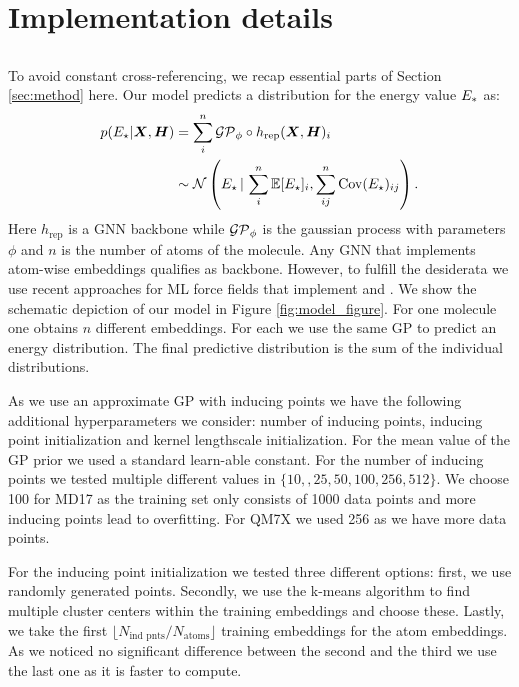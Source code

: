 \section{Implementation details}\label{app:implementation_details}
\subsection{\ours{}}
To avoid constant cross-referencing, we recap essential parts of Section \ref{sec:method} here. Our model predicts a distribution for the energy value $E_*$ as: 
\begin{align}
    p(E_\star \vert \bm{X}, \bm{H}) &= \sum_i^n \mathcal{GP}_\phi \circ h_{\text{rep}}(\bm{X}, \bm{H})_{i}\\ 
    &\sim \mathcal{N}\left(E_\star \,\vert\,\sum_i^n \operatorname{\mathbb{E}} [E_\star]_i, \sum_{ij}^n \mathrm{Cov}(E_\star)_{ij}\right).\nonumber
\end{align}
Here $h_{\text{rep}}$ is a GNN backbone while $\mathcal{GP}_\phi$ is the gaussian process with parameters $\phi$ and $n$ is the number of atoms of the molecule. Any GNN that implements atom-wise embeddings qualifies as backbone. However, to fulfill the desiderata we use recent approaches for ML force fields that implement \desone{} and \destwo{}. We show the schematic depiction of our model in Figure \ref{fig:model_figure}. For one molecule one obtains $n$ different embeddings. For each we use the same GP to predict an energy distribution. The final predictive distribution is the sum of the individual distributions. 

As we use an approximate GP with inducing points we have the following additional hyperparameters we consider: number of inducing points, inducing point initialization and kernel lengthscale initialization. For the mean value of the GP prior we used a standard learn-able constant. For the number of inducing points we tested multiple different values in $\{10, ,25, 50, 100, 256, 512\}$. We choose 100 for MD17 as the training set only consists of 1000 data points and more inducing points lead to overfitting. For QM7X we used 256 as we have more data points. 

For the inducing point initialization we tested three different options: first, we use randomly generated points. Secondly, we use the k-means algorithm to find multiple cluster centers within the training embeddings and choose these. Lastly, we take the first $\lfloor N_{\text{ind pnts}} / N_{\text{atoms}}\rfloor$ training embeddings for the atom embeddings. As we noticed no significant difference between the second and the third we use the last one as it is faster to compute. 

